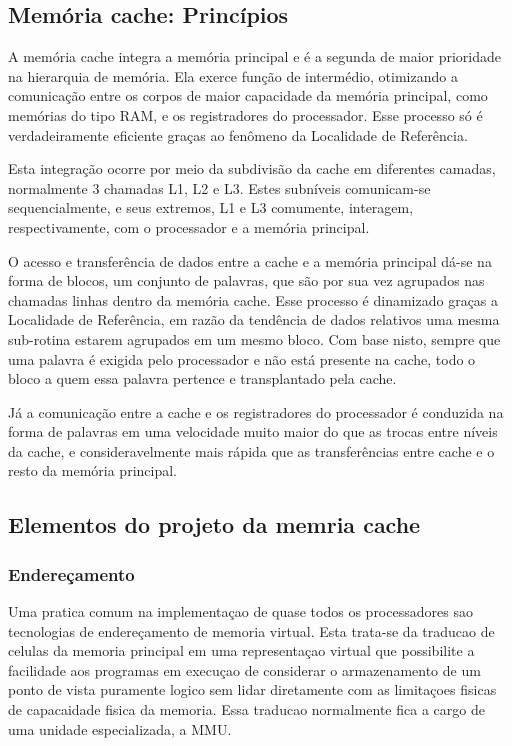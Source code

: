 \documentclass[12pt]{article}
\begin{document}
\subsection{Memória cache: Princípios}
A memória cache integra a memória principal e é a segunda de maior prioridade na hierarquia de memória. Ela exerce função de intermédio, otimizando a comunicação entre os corpos de maior capacidade da memória principal, como memórias do tipo RAM, e os registradores do processador. Esse processo só é verdadeiramente eficiente graças ao fenômeno da Localidade de Referência. 

Esta integração ocorre por meio da subdivisão da cache em diferentes camadas, normalmente 3 chamadas L1, L2 e L3. Estes subníveis comunicam-se sequencialmente, e seus extremos, L1 e L3 comumente, interagem, respectivamente, com o processador e a memória principal. 

O acesso e transferência de dados entre a cache e a memória principal dá-se na forma de blocos, um conjunto de palavras, que são por sua vez agrupados nas chamadas linhas dentro da memória cache. Esse processo é dinamizado graças a Localidade de Referência, em razão da tendência de dados relativos uma mesma sub-rotina estarem agrupados em um mesmo bloco. Com base nisto, sempre que uma palavra é exigida pelo processador e não está presente na cache, todo o bloco a quem essa palavra pertence e transplantado pela cache. 

Já a comunicação entre a cache e os registradores do processador é conduzida na forma de palavras em uma velocidade muito maior do que as trocas entre níveis da cache, e consideravelmente mais rápida que as transferências entre cache e o resto da memória principal.
\subsection{Elementos do projeto da memria cache}
\subsubsection*{Endereçamento}
Uma pratica comum na implementaçao de quase todos os processadores sao tecnologias de endereçamento de memoria virtual. Esta trata-se da traducao de celulas da memoria principal em uma representaçao virtual que possibilite a facilidade aos programas em execuçao de considerar o armazenamento de um ponto de vista puramente logico sem lidar diretamente com as limitaçoes fisicas de capacaidade fisica da memoria. Essa traducao normalmente fica a cargo de uma unidade especializada, a MMU.
\end{document}
